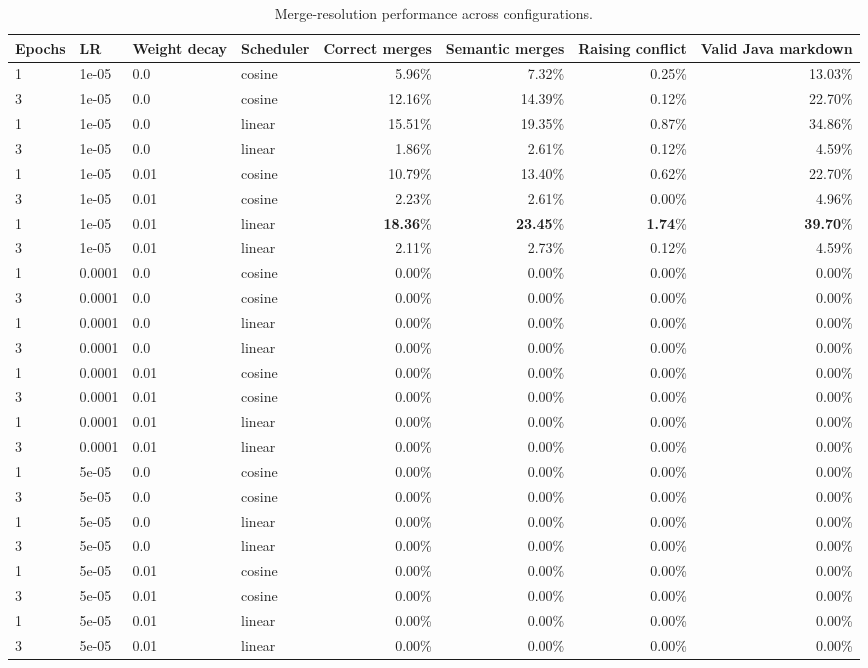 \begin{table}[ht]
\centering
\begin{tabular}{l l l l r r r r}
\toprule
Epochs & LR & Weight decay & Scheduler & Correct merges & Semantic merges & Raising conflict & Valid Java markdown \\
\midrule
1 & 1e-05 & 0.0 & cosine & 5.96\% & 7.32\% & 0.25\% & 13.03\% \\
3 & 1e-05 & 0.0 & cosine & 12.16\% & 14.39\% & 0.12\% & 22.70\% \\
1 & 1e-05 & 0.0 & linear & 15.51\% & 19.35\% & 0.87\% & 34.86\% \\
3 & 1e-05 & 0.0 & linear & 1.86\% & 2.61\% & 0.12\% & 4.59\% \\
1 & 1e-05 & 0.01 & cosine & 10.79\% & 13.40\% & 0.62\% & 22.70\% \\
3 & 1e-05 & 0.01 & cosine & 2.23\% & 2.61\% & 0.00\% & 4.96\% \\
1 & 1e-05 & 0.01 & linear & \textbf{18.36}\% & \textbf{23.45}\% & \textbf{1.74}\% & \textbf{39.70}\% \\
3 & 1e-05 & 0.01 & linear & 2.11\% & 2.73\% & 0.12\% & 4.59\% \\
1 & 0.0001 & 0.0 & cosine & 0.00\% & 0.00\% & 0.00\% & 0.00\% \\
3 & 0.0001 & 0.0 & cosine & 0.00\% & 0.00\% & 0.00\% & 0.00\% \\
1 & 0.0001 & 0.0 & linear & 0.00\% & 0.00\% & 0.00\% & 0.00\% \\
3 & 0.0001 & 0.0 & linear & 0.00\% & 0.00\% & 0.00\% & 0.00\% \\
1 & 0.0001 & 0.01 & cosine & 0.00\% & 0.00\% & 0.00\% & 0.00\% \\
3 & 0.0001 & 0.01 & cosine & 0.00\% & 0.00\% & 0.00\% & 0.00\% \\
1 & 0.0001 & 0.01 & linear & 0.00\% & 0.00\% & 0.00\% & 0.00\% \\
3 & 0.0001 & 0.01 & linear & 0.00\% & 0.00\% & 0.00\% & 0.00\% \\
1 & 5e-05 & 0.0 & cosine & 0.00\% & 0.00\% & 0.00\% & 0.00\% \\
3 & 5e-05 & 0.0 & cosine & 0.00\% & 0.00\% & 0.00\% & 0.00\% \\
1 & 5e-05 & 0.0 & linear & 0.00\% & 0.00\% & 0.00\% & 0.00\% \\
3 & 5e-05 & 0.0 & linear & 0.00\% & 0.00\% & 0.00\% & 0.00\% \\
1 & 5e-05 & 0.01 & cosine & 0.00\% & 0.00\% & 0.00\% & 0.00\% \\
3 & 5e-05 & 0.01 & cosine & 0.00\% & 0.00\% & 0.00\% & 0.00\% \\
1 & 5e-05 & 0.01 & linear & 0.00\% & 0.00\% & 0.00\% & 0.00\% \\
3 & 5e-05 & 0.01 & linear & 0.00\% & 0.00\% & 0.00\% & 0.00\% \\
\bottomrule
\end{tabular}
\caption{Merge-resolution performance across configurations.}
\end{table}
